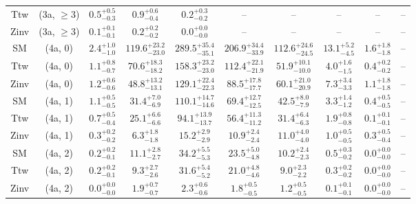 \begin{table}[h!]
{\begin{tabular}{cccccccccc}
	Ttw & (3a, $\ge3$) & $0.5^{+ 0.5 }_{- 0.3 }$ & $0.9^{+ 0.6 }_{- 0.4 }$ & $0.2^{+ 0.3 }_{- 0.2 }$ & -- & -- & -- & -- & -- \\[0.5ex] 
	Zinv & (3a, $\ge3$) & $0.1^{+ 0.1 }_{- 0.1 }$ & $0.2^{+ 0.2 }_{- 0.2 }$ & $0.0^{+ 0.0 }_{- 0.0 }$ & -- & -- & -- & -- & -- \\[0.5ex] 
	SM & (4a, 0) & $2.4^{+ 1.0 }_{- 1.0 }$ & $119.6^{+ 23.2 }_{- 23.0 }$ & $289.5^{+ 35.4 }_{- 35.1 }$ & $206.9^{+ 34.4 }_{- 33.9 }$ & $112.6^{+ 24.6 }_{- 24.5 }$ & $13.1^{+ 5.2 }_{- 4.5 }$ & $1.6^{+ 1.8 }_{- 1.8 }$ & -- \\[0.5ex] 
	Ttw & (4a, 0) & $1.1^{+ 0.8 }_{- 0.7 }$ & $70.6^{+ 18.3 }_{- 18.2 }$ & $158.3^{+ 23.2 }_{- 23.0 }$ & $112.4^{+ 22.1 }_{- 21.9 }$ & $51.9^{+ 10.1 }_{- 10.0 }$ & $4.0^{+ 1.6 }_{- 1.5 }$ & $0.4^{+ 0.2 }_{- 0.2 }$ & -- \\[0.5ex] 
	Zinv & (4a, 0) & $1.2^{+ 0.6 }_{- 0.6 }$ & $48.8^{+ 13.2 }_{- 13.1 }$ & $129.1^{+ 22.4 }_{- 22.3 }$ & $88.5^{+ 17.8 }_{- 17.7 }$ & $60.1^{+ 21.0 }_{- 20.9 }$ & $7.3^{+ 3.4 }_{- 3.3 }$ & $1.1^{+ 1.8 }_{- 1.8 }$ & -- \\[0.5ex] 
	SM & (4a, 1) & $1.1^{+ 0.5 }_{- 0.5 }$ & $31.4^{+ 7.0 }_{- 6.9 }$ & $110.1^{+ 14.7 }_{- 14.6 }$ & $69.4^{+ 12.7 }_{- 12.5 }$ & $42.5^{+ 8.0 }_{- 7.9 }$ & $3.3^{+ 1.4 }_{- 1.2 }$ & $0.4^{+ 0.5 }_{- 0.5 }$ & -- \\[0.5ex] 
	Ttw & (4a, 1) & $0.7^{+ 0.5 }_{- 0.4 }$ & $25.1^{+ 6.6 }_{- 6.6 }$ & $94.1^{+ 13.9 }_{- 13.7 }$ & $56.4^{+ 11.3 }_{- 11.2 }$ & $31.4^{+ 6.4 }_{- 6.3 }$ & $1.9^{+ 0.8 }_{- 0.8 }$ & $0.1^{+ 0.1 }_{- 0.1 }$ & -- \\[0.5ex] 
	Zinv & (4a, 1) & $0.3^{+ 0.2 }_{- 0.2 }$ & $6.3^{+ 1.8 }_{- 1.8 }$ & $15.2^{+ 2.9 }_{- 2.9 }$ & $10.9^{+ 2.4 }_{- 2.4 }$ & $11.0^{+ 4.0 }_{- 4.0 }$ & $1.0^{+ 0.5 }_{- 0.5 }$ & $0.3^{+ 0.5 }_{- 0.4 }$ & -- \\[0.5ex] 
	SM & (4a, 2) & $0.2^{+ 0.2 }_{- 0.1 }$ & $11.1^{+ 2.8 }_{- 2.7 }$ & $34.2^{+ 5.5 }_{- 5.3 }$ & $23.5^{+ 5.0 }_{- 4.8 }$ & $10.2^{+ 2.4 }_{- 2.3 }$ & $0.5^{+ 0.3 }_{- 0.2 }$ & $0.0^{+ 0.0 }_{- 0.0 }$ & -- \\[0.5ex] 
	Ttw & (4a, 2) & $0.2^{+ 0.2 }_{- 0.1 }$ & $9.3^{+ 2.7 }_{- 2.6 }$ & $31.6^{+ 5.4 }_{- 5.2 }$ & $21.0^{+ 4.8 }_{- 4.6 }$ & $9.0^{+ 2.3 }_{- 2.2 }$ & $0.3^{+ 0.2 }_{- 0.2 }$ & $0.0^{+ 0.0 }_{- 0.0 }$ & -- \\[0.5ex] 
	Zinv & (4a, 2) & $0.0^{+ 0.0 }_{- 0.0 }$ & $1.9^{+ 0.7 }_{- 0.7 }$ & $2.3^{+ 0.6 }_{- 0.6 }$ & $1.8^{+ 0.5 }_{- 0.5 }$ & $1.2^{+ 0.5 }_{- 0.5 }$ & $0.1^{+ 0.1 }_{- 0.1 }$ & $0.0^{+ 0.0 }_{- 0.0 }$ & -- \\[0.5ex] 

\end{tabular}}
\end{table}
